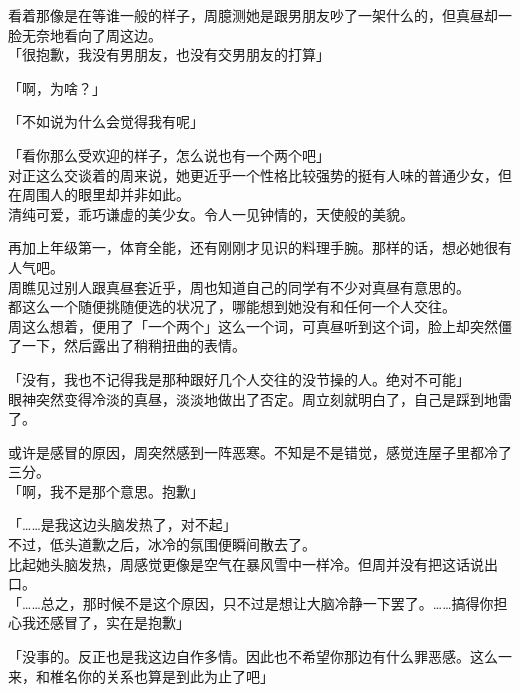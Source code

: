 看着那像是在等谁一般的样子，周臆测她是跟男朋友吵了一架什么的，但真昼却一脸无奈地看向了周这边。\\

「很抱歉，我没有男朋友，也没有交男朋友的打算」

「啊，为啥？」

「不如说为什么会觉得我有呢」

「看你那么受欢迎的样子，怎么说也有一个两个吧」\\

对正这么交谈着的周来说，她更近乎一个性格比较强势的挺有人味的普通少女，但在周围人的眼里却并非如此。\\

清纯可爱，乖巧谦虚的美少女。令人一见钟情的，天使般的美貌。

再加上年级第一，体育全能，还有刚刚才见识的料理手腕。那样的话，想必她很有人气吧。\\

周瞧见过别人跟真昼套近乎，周也知道自己的同学有不少对真昼有意思的。\\

都这么一个随便挑随便选的状况了，哪能想到她没有和任何一个人交往。\\

周这么想着，便用了「一个两个」这么一个词，可真昼听到这个词，脸上却突然僵了一下，然后露出了稍稍扭曲的表情。

「没有，我也不记得我是那种跟好几个人交往的没节操的人。绝对不可能」\\

眼神突然变得冷淡的真昼，淡淡地做出了否定。周立刻就明白了，自己是踩到地雷了。

或许是感冒的原因，周突然感到一阵恶寒。不知是不是错觉，感觉连屋子里都冷了三分。\\

「啊，我不是那个意思。抱歉」

「……是我这边头脑发热了，对不起」\\

不过，低头道歉之后，冰冷的氛围便瞬间散去了。\\

比起她头脑发热，周感觉更像是空气在暴风雪中一样冷。但周并没有把这话说出口。\\

「……总之，那时候不是这个原因，只不过是想让大脑冷静一下罢了。……搞得你担心我还感冒了，实在是抱歉」

「没事的。反正也是我这边自作多情。因此也不希望你那边有什么罪恶感。这么一来，和椎名你的关系也算是到此为止了吧」\\

